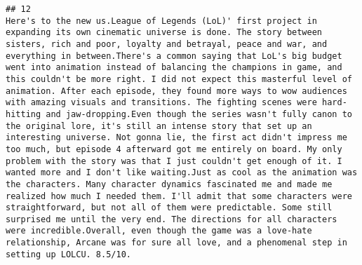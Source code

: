 \documentclass[
]{article}
\begin{document}
\begin{verbatim}
## 12                                                                                                                                                                                                                                                                                                                                                                                                                                                                                                                                                                                                                                                                                                                                                                                                                                                                                                                                                                                                                                                                                                                                                                                                                                                                                                                                                                                                                                                                                                                                                                                                                                         Here's to the new us.League of Legends (LoL)' first project in expanding its own cinematic universe is done. The story between sisters, rich and poor, loyalty and betrayal, peace and war, and everything in between.There's a common saying that LoL's big budget went into animation instead of balancing the champions in game, and this couldn't be more right. I did not expect this masterful level of animation. After each episode, they found more ways to wow audiences with amazing visuals and transitions. The fighting scenes were hard-hitting and jaw-dropping.Even though the series wasn't fully canon to the original lore, it's still an intense story that set up an interesting universe. Not gonna lie, the first act didn't impress me too much, but episode 4 afterward got me entirely on board. My only problem with the story was that I just couldn't get enough of it. I wanted more and I don't like waiting.Just as cool as the animation was the characters. Many character dynamics fascinated me and made me realized how much I needed them. I'll admit that some characters were straightforward, but not all of them were predictable. Some still surprised me until the very end. The directions for all characters were incredible.Overall, even though the game was a love-hate relationship, Arcane was for sure all love, and a phenomenal step in setting up LOLCU. 8.5/10.

\end{verbatim}
\end{document}
